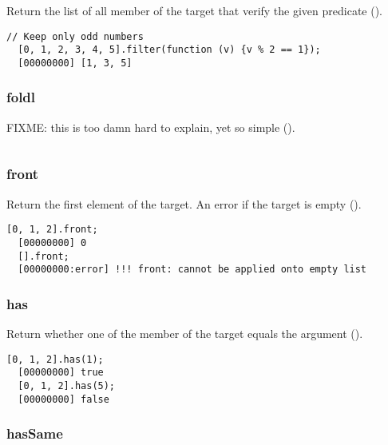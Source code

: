 Return the list of all member of the target that verify the given
predicate ().

\begin{lstlisting}[caption=List.filter, label=lst:list-filter, float=\floatposh]
  // Keep only odd numbers
  [0, 1, 2, 3, 4, 5].filter(function (v) {v % 2 == 1});
  [00000000] [1, 3, 5]
\end{lstlisting}

\subsubsection{foldl}

FIXME: this is too damn hard to explain, yet so simple
().

\begin{lstlisting}[caption=List.foldl, label=lst:list-foldl, float=\floatposh]

\end{lstlisting}

\subsubsection{front}
\label{sect:std-list-front}

Return the first element of the target. An error if the target is
empty ().

\begin{lstlisting}[caption=List.front, label=lst:list-front, float=\floatposh]
  [0, 1, 2].front;
  [00000000] 0
  [].front;
  [00000000:error] !!! front: cannot be applied onto empty list
\end{lstlisting}

\subsubsection{has}

Return whether one of the member of the target equals the argument
().

\begin{lstlisting}[caption=List.has, label=lst:list-has, float=\floatposh]
  [0, 1, 2].has(1);
  [00000000] true
  [0, 1, 2].has(5);
  [00000000] false
\end{lstlisting}

\subsubsection{hasSame}

